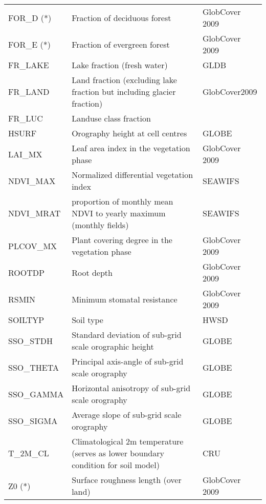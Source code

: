 \begin{longtable}{p{2.5cm}p{8.5cm}p{3.3cm}}
  FOR\_D (*)                            & Fraction of deciduous forest                    &        GlobCover 2009     \\
  FOR\_E (*)                            & Fraction of evergreen forest                    &        GlobCover 2009     \\
  FR\_LAKE                              & Lake fraction (fresh water)                     &        GLDB               \\                     
  FR\_LAND                              & Land fraction (excluding lake fraction but including glacier fraction) & GlobCover2009   \\
  FR\_LUC                               & Landuse class fraction                          &                           \\
  HSURF                                 & Orography height at cell centres                &        GLOBE              \\
  LAI\_MX                               & Leaf area index in the vegetation phase         &        GlobCover 2009     \\
  NDVI\_MAX                             & Normalized differential vegetation index        &        SEAWIFS            \\
  NDVI\_MRAT                            & proportion of monthly mean NDVI to yearly maximum (monthly fields)&  SEAWIFS \\
  PLCOV\_MX                             & Plant covering degree in the vegetation phase   &        GlobCover 2009     \\
  ROOTDP                                & Root depth                                      &        GlobCover 2009     \\
  RSMIN                                 & Minimum stomatal resistance                     &        GlobCover 2009     \\
  SOILTYP                               & Soil type                                       &        HWSD               \\
  SSO\_STDH                             & Standard deviation of sub-grid scale orographic height  &   GLOBE           \\
  SSO\_THETA                            & Principal axis-angle of sub-grid scale orography &          GLOBE           \\
  SSO\_GAMMA                            & Horizontal anisotropy of sub-grid scale orography &         GLOBE           \\
  SSO\_SIGMA                            & Average slope of sub-grid scale orography       &           GLOBE           \\
  T\_2M\_CL                             & Climatological 2m temperature (serves as lower boundary condition for soil model)  &  CRU \\
  Z0 (*)                                & Surface roughness length (over land)            &         GlobCover 2009    \\                        
  \bottomrule
\end{longtable}

